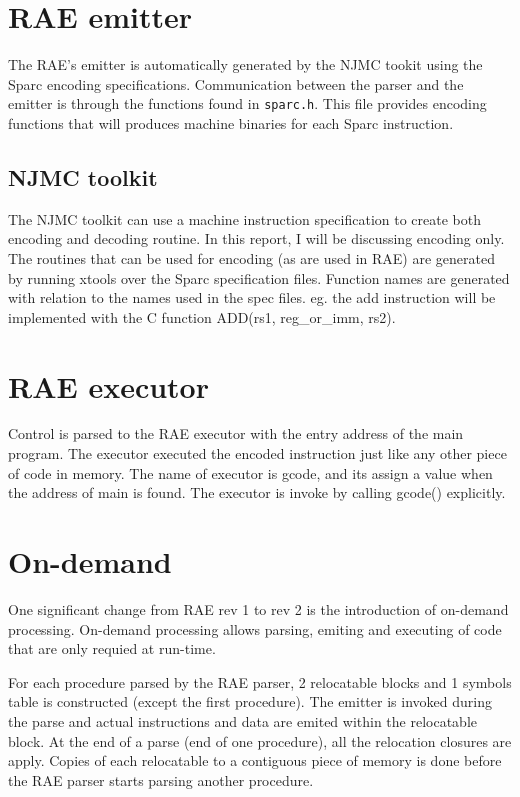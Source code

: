 \section{RAE emitter} The RAE's emitter is automatically generated by the
NJMC tookit using the Sparc encoding specifications.  Communication
between the parser and the emitter is through the functions found in
\texttt{sparc.h}.  This file provides encoding functions that will
produces machine binaries for each Sparc instruction. 


\subsection{NJMC toolkit}

The NJMC toolkit can use a machine instruction specification to create
both encoding and decoding routine.  In this report, I will be discussing
encoding only.  The routines that can be used for encoding (as are used in
RAE) are generated by running xtools over the Sparc specification files. 
Function names are generated with relation to the names used in the spec
files.  eg. the add instruction will be implemented with the C function
ADD(rs1, reg\_or\_imm, rs2). 


\section{RAE executor} Control is parsed to the RAE executor with the
entry address of the main program.  The executor executed the encoded
instruction just like any other piece of code in memory.  The name of
executor is gcode, and its assign a value when the address of main is
found.  The executor is invoke by calling gcode() explicitly. 


\section{On-demand} One significant change from RAE rev 1 to rev 2 is the
introduction of on-demand processing.  On-demand processing allows
parsing, emiting and executing of code that are only requied at run-time. 

For each procedure parsed by the RAE parser, 2 relocatable blocks and 1
symbols table is constructed (except the first procedure).  The emitter is
invoked during the parse and actual instructions and data are emited
within the relocatable block.  At the end of a parse (end of one
procedure), all the relocation closures are apply.  Copies of each
relocatable to a contiguous piece of memory is done before the RAE parser
starts parsing another procedure. 

